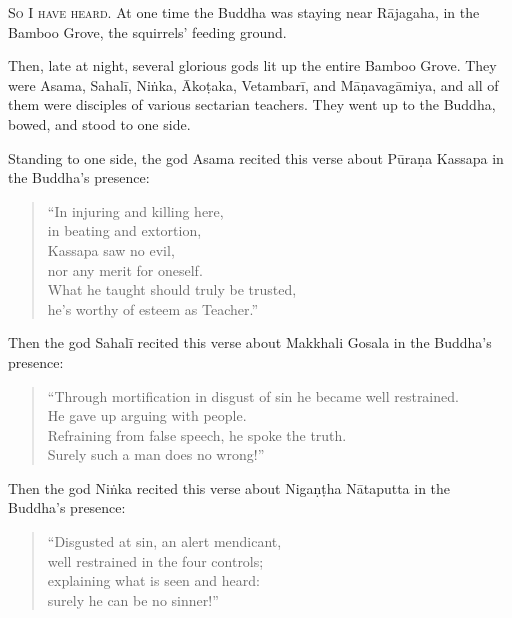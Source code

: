 \documentclass[12pt,openany]{book}%
\newcommand*{\scevam}[1]{\textsc{#1}}
\begin{document}
\scevam{So I have heard. }At one time the Buddha was staying near \textsanskrit{Rājagaha}, in the Bamboo Grove, the squirrels’ feeding ground. 

Then, late at night, several glorious gods lit up the entire Bamboo Grove. They were Asama, \textsanskrit{Sahalī}, \textsanskrit{Niṅka}, \textsanskrit{Ākoṭaka}, \textsanskrit{Vetambarī}, and \textsanskrit{Māṇavagāmiya}, and all of them were disciples of various sectarian teachers. They went up to the Buddha, bowed, and stood to one side. 

Standing to one side, the god Asama recited this verse about \textsanskrit{Pūraṇa} Kassapa in the Buddha’s presence: 

\begin{verse}%
“In injuring and killing here, \\
in beating and extortion, \\
Kassapa saw no evil, \\
nor any merit for oneself. \\
What he taught should truly be trusted, \\
he’s worthy of esteem as Teacher.” 

%
\end{verse}

Then the god \textsanskrit{Sahalī} recited this verse about Makkhali Gosala in the Buddha’s presence: 

\begin{verse}%
“Through mortification in disgust of sin he became well restrained. \\
He gave up arguing with people. \\
Refraining from false speech, he spoke the truth. \\
Surely such a man does no wrong!” 

%
\end{verse}

Then the god \textsanskrit{Niṅka} recited this verse about \textsanskrit{Nigaṇṭha} \textsanskrit{Nātaputta} in the Buddha’s presence: 

\begin{verse}%
“Disgusted at sin, an alert mendicant, \\
well restrained in the four controls; \\
explaining what is seen and heard: \\
surely he can be no sinner!” 

%
\end{verse}
\end{document}
